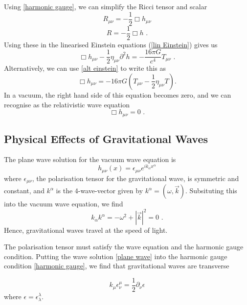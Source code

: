 \documentclass[11pt]{cuthesis}
\newcommand{\mn}{_{\mu\nu}}
\newcommand{\fs}{\text{ .}}
\begin{document}
Using \ref{harmonic gauge}, we can simplify the Ricci tensor and scalar
\begin{equation}
R\mn = -\frac{1}{2}\Box h\mn
\end{equation}
\begin{equation}
R=-\frac{1}{2}\Box h \fs
\end{equation}
Using these in the linearised Einstein equations (\ref{lin Einstein}) gives us
\begin{equation}
\Box h\mn - \frac{1}{2}\eta\mn\partial^2 h =-\frac{16\pi G}{c^4}T\mn \fs
\end{equation}
Alternatively, we can use \ref{alt einstein} to write this as
\begin{equation}
\Box h\mn = -16\pi G \left( T\mn -\frac{1}{2} \eta\mn T \right). 
\end{equation}
In a vacuum, the right hand side of this equation becomes zero, and we can recognise as the relativistic wave equation
 \begin{equation}
\Box h\mn = 0 \fs
\end{equation}

\subsection{Physical Effects of Gravitational Waves}
The plane wave solution for the vacuum wave equation is
\begin{equation} \label{plane wave}
h\mn (x) = \epsilon\mn e^{ik_\alpha x^\alpha} 
\end{equation}
where $\epsilon\mn$, the polarisation tensor for the gravitational wave, is symmetric and constant, and $k^\alpha$ is the 4-wave-vector given by $k^\alpha = (\omega,\vec{k})$. Subsituting this into the vacuum wave equation, we find 
\begin{equation}
k_\alpha k^\alpha = -\omega^2 + |\vec{k}|^2 =0 \fs
\end{equation}
Hence, gravitational waves travel at the speed of light. 

The polarisation tensor must satisfy the wave equation and the harmonic gauge condition. Putting the wave solution \ref{plane wave} into the harmonic gauge condition \ref{harmonic gauge}, we find that gravitational waves are transverse

\begin{equation}  \label{harmonic gauge2}
k_\mu \epsilon^\mu_\nu = \frac{1}{2}\partial_\nu \epsilon
\end{equation}
where $\epsilon=\epsilon^\lambda_\lambda$.
\end{document}
